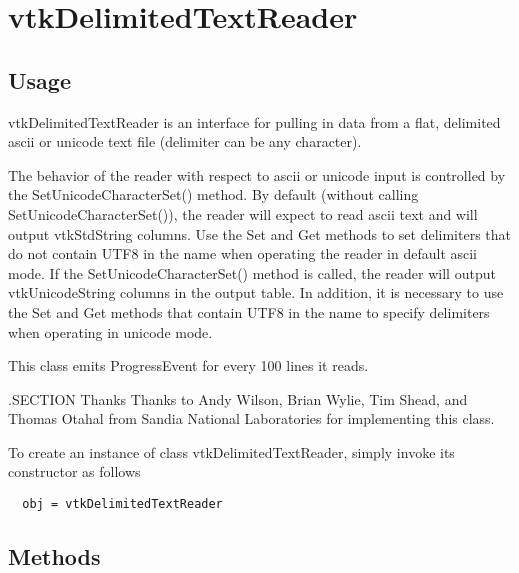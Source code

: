 \section{vtkDelimitedTextReader}

\subsection{Usage}

 vtkDelimitedTextReader is an interface for pulling in data from a
 flat, delimited ascii or unicode text file (delimiter can be any character).

 The behavior of the reader with respect to ascii or unicode input is controlled
 by the SetUnicodeCharacterSet() method.  By default (without calling SetUnicodeCharacterSet()),
 the reader will expect to read ascii text and will output vtkStdString columns.  Use 
 the Set and Get methods to set delimiters that do not contain UTF8 in the name when operating 
 the reader in default ascii mode.  If the SetUnicodeCharacterSet() method is called, the reader 
 will output vtkUnicodeString columns in the output table.  In addition, it is necessary to use 
 the Set and Get methods that contain UTF8 in the name to specify delimiters when operating in 
 unicode mode.

 This class emits ProgressEvent for every 100 lines it reads.

 .SECTION Thanks
 Thanks to Andy Wilson, Brian Wylie, Tim Shead, and Thomas Otahal
 from Sandia National Laboratories for implementing this class.
 

To create an instance of class vtkDelimitedTextReader, simply
invoke its constructor as follows
\begin{verbatim}
  obj = vtkDelimitedTextReader
\end{verbatim}
\subsection{Methods}

